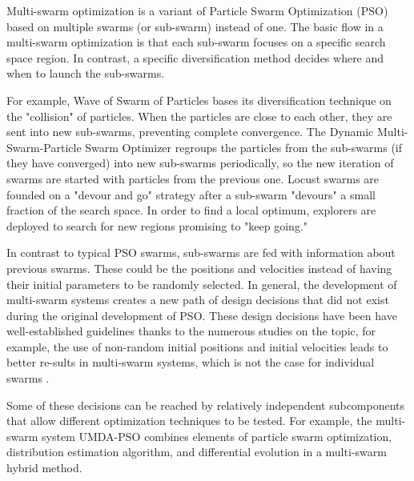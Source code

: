 \documentclass[runningheads]{llncs}
\begin{document}


Multi-swarm optimization is a variant of Particle Swarm Optimization
(PSO) based on multiple swarms (or sub-swarm) instead of one. The basic flow in
a multi-swarm optimization is that each sub-swarm focuses on a specific search
space region. In contrast, a specific diversification method decides where and
when to launch the sub-swarms.

For example, Wave of Swarm of Particles \cite{b6} bases its
diversification technique on the "collision" of particles. When the
particles are close to each other, they are sent into new sub-swarms,
preventing complete convergence. The Dynamic Multi-Swarm-Particle
Swarm Optimizer\cite{b7} regroups the particles from the sub-swarms
(if they have converged) into new sub-swarms periodically, so the new
iteration of swarms are started with particles from the previous
one. Locust swarms \cite{b8} are founded on a "devour and go" strategy
after a sub-swarm "devours" a small fraction of the search space. In
order to find a local optimum, explorers are deployed to search for
new regions promising to "keep going." %

In contrast to typical PSO swarms, sub-swarms are fed with 
information %
about previous swarms. These could be the positions and velocities instead of having their initial parameters to be randomly selected. In general, the development of multi-swarm systems creates a new path of design decisions that did not exist during the original development of PSO. These design decisions have been have well-established guidelines thanks to the numerous studies on the topic, for example, the use of non-random initial positions and initial velocities leads to better re-sults in multi-swarm systems, which is not the case for individual swarms \cite{b9}.

Some of these decisions can be reached by relatively independent
subcomponents that allow different optimization techniques to be
tested. For example, the multi-swarm system UMDA-PSO \cite{b10}
combines elements of particle swarm optimization, distribution
estimation algorithm, and differential evolution in a multi-swarm
hybrid method. %
\end{document}
